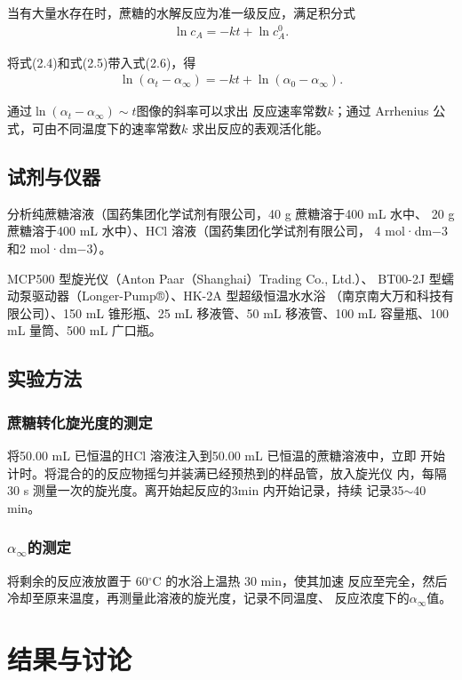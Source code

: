 \documentclass[12pt]{ctexart}
\numberwithin{equation}{section}
\begin{document}
当有大量水存在时，蔗糖的水解反应为准一级反应，满足积分式
\begin{align}
    \ln c_A = - kt + \ln c_A^0.
\end{align}

将式(2.4)和式(2.5)带入式(2.6)，得
\begin{align}
    \ln (\alpha_t - \alpha_\infty)
        = - kt + \ln (\alpha_0 - \alpha_\infty).
\end{align}

通过$\ln(\alpha_t - \alpha_\infty) \sim t$图像的斜率可以求出
反应速率常数$k$；通过 Arrhenius 公式，可由不同温度下的速率常数$k$
求出反应的表观活化能。

\subsection{试剂与仪器}

分析纯蔗糖溶液（国药集团化学试剂有限公司，40 g 蔗糖溶于400 mL 水中、
20 g 蔗糖溶于400 mL 水中）、HCl 溶液（国药集团化学试剂有限公司，
4 mol·dm−3 和2 mol·dm−3）。

MCP500 型旋光仪（Anton Paar（Shanghai）Trading Co., Ltd.）、
BT00-2J 型蠕动泵驱动器（Longer-Pump®）、HK-2A 型超级恒温水水浴
（南京南大万和科技有限公司）、150 mL 锥形瓶、25 mL 移液管、50 mL
移液管、100 mL 容量瓶、100 mL 量筒、500 mL 广口瓶。

\subsection{实验方法}
\subsubsection{蔗糖转化旋光度的测定}

将50.00 mL 已恒温的HCl 溶液注入到50.00 mL 已恒温的蔗糖溶液中，立即
开始计时。将混合的的反应物摇匀并装满已经预热到的样品管，放入旋光仪
内，每隔30 s 测量一次的旋光度。离开始起反应的3min 内开始记录，持续
记录35$\sim$40 min。

\subsubsection{\texorpdfstring{$\alpha_{\infty}$的测定}{反应完全进行时溶液旋光度的测定}}

将剩余的反应液放置于 60$^\circ$C 的水浴上温热 30 min，使其加速
反应至完全，然后冷却至原来温度，再测量此溶液的旋光度，记录不同温度、
反应浓度下的$\alpha_{\infty}$值。

\section{结果与讨论}
\end{document}
